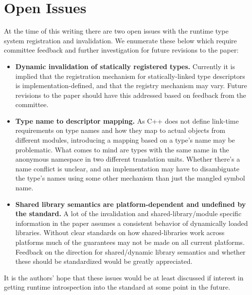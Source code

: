 \section{Open Issues}

At the time of this writing there are two open issues with the runtime type
system registration and invalidation. We enumerate these below which require
committee feedback and further investigation for future revisions to the
paper:

\begin{itemize}

 \item \textbf{Dynamic invalidation of statically registered types.} Currently
it is implied that the registration mechanism for statically-linked type
descriptors is implementation-defined, and that the registry mechanism may
vary. Future revisions to the paper should have this addressed based on
feedback from the committee.

 \item \textbf{Type name to descriptor mapping.} As C++ does not define
link-time requirements on type names and how they map to actual objects from
different modules, introducing a mapping based on a type's name may be
problematic. What comes to mind are types with the same name in the anonymous
namespace in two different translation units. Whether there's a name conflict
is unclear, and an implementation may have to disambiguate the type's names
using some other mechanism than just the mangled symbol name.

 \item \textbf{Shared library semantics are platform-dependent and undefined
by the standard.} A lot of the invalidation and shared-library/module specific
information in the paper assumes a consistent behavior of dynamically loaded
libraries. Without clear standards on how shared-libraries work across
platforms much of the guarantees may not be made on all current platforms.
Feedback on the direction for shared/dynamic library semantics and whether
these should be standardized would be greatly appreciated.

\end{itemize}

It is the authors' hope that these issues would be at least discussed if
interest in getting runtime introspection into the standard at some point in
the future.